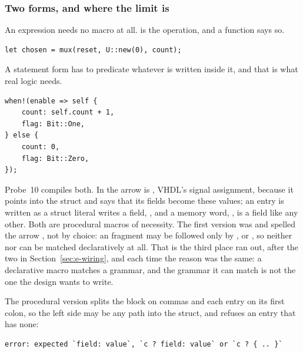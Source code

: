 \subsubsection{Two forms, and where the limit is}

An expression needs no macro at all.  is the operation, and a
function says so.

\begin{lstlisting}[caption={The expression form is a function. There is nothing to predicate.},label={lst:mux}]
let chosen = mux(reset, U::new(0), count);
\end{lstlisting}

A statement form has to predicate whatever is written inside it, and that
is what real logic needs.

\begin{lstlisting}[caption={The statement form, condition first. The struct is named once; each entry is a field becoming a value, and the entries after \code{else} are under the condition's failure. The same block with the struct first is \code{with!(self <= \{ enable ? \{ .. \} else \{ .. \} \})}.},label={lst:when}]
when!(enable => self {
    count: self.count + 1,
    flag: Bit::One,
} else {
    count: 0,
    flag: Bit::Zero,
});
\end{lstlisting}

Probe~10 compiles both. In  the arrow is \code{<=},
VHDL's signal assignment, because it points into the struct and says
that its fields become these values; an entry is written as a struct
literal writes a field, , and a memory word,
, is a field like any other. Both are procedural
macros of necessity. The first version was  and spelled
the arrow \code{=>}, not by choice: an  fragment may be
followed only by \code{=>}, \code{,} or \code{;}, so neither
 nor  can be matched declaratively at
all. That is the third place  ran out, after the
two in Section~\ref{sec:e-wiring}, and each time the reason was the
same: a declarative macro matches a grammar, and the grammar it can
match is not the one the design wants to write.

The procedural version splits the block on commas and each entry on
its first colon, so the left side may be any path into the struct,
and refuses an entry that has none:

\begin{lstlisting}[style=ascii,caption={A drive without a colon. The macro's own message, not a type error three expansions later.},label={lst:when-err}]
error: expected `field: value`, `c ? field: value` or `c ? { .. }`
\end{lstlisting}

